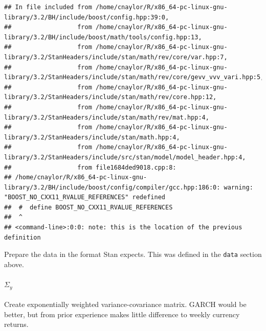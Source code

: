 \documentclass[]{article}
\let\oldparagraph\paragraph
\renewcommand{\paragraph}[1]{\oldparagraph{#1}\mbox{}}
\begin{document}
\begin{verbatim}
## In file included from /home/cnaylor/R/x86_64-pc-linux-gnu-library/3.2/BH/include/boost/config.hpp:39:0,
##                  from /home/cnaylor/R/x86_64-pc-linux-gnu-library/3.2/BH/include/boost/math/tools/config.hpp:13,
##                  from /home/cnaylor/R/x86_64-pc-linux-gnu-library/3.2/StanHeaders/include/stan/math/rev/core/var.hpp:7,
##                  from /home/cnaylor/R/x86_64-pc-linux-gnu-library/3.2/StanHeaders/include/stan/math/rev/core/gevv_vvv_vari.hpp:5,
##                  from /home/cnaylor/R/x86_64-pc-linux-gnu-library/3.2/StanHeaders/include/stan/math/rev/core.hpp:12,
##                  from /home/cnaylor/R/x86_64-pc-linux-gnu-library/3.2/StanHeaders/include/stan/math/rev/mat.hpp:4,
##                  from /home/cnaylor/R/x86_64-pc-linux-gnu-library/3.2/StanHeaders/include/stan/math.hpp:4,
##                  from /home/cnaylor/R/x86_64-pc-linux-gnu-library/3.2/StanHeaders/include/src/stan/model/model_header.hpp:4,
##                  from file1684ded9018.cpp:8:
## /home/cnaylor/R/x86_64-pc-linux-gnu-library/3.2/BH/include/boost/config/compiler/gcc.hpp:186:0: warning: "BOOST_NO_CXX11_RVALUE_REFERENCES" redefined
##  #  define BOOST_NO_CXX11_RVALUE_REFERENCES
##  ^
## <command-line>:0:0: note: this is the location of the previous definition
\end{verbatim}

Prepare the data in the format Stan expects. This was defined in the
\texttt{data} section above.

\paragraph{\texorpdfstring{\(\Sigma_y\)}{\textbackslash{}Sigma\_y}}\label{sigma_y}

Create exponentially weighted variance-covariance matrix. GARCH would be
better, but from prior experience makes little difference to weekly
currency returns.
\end{document}

